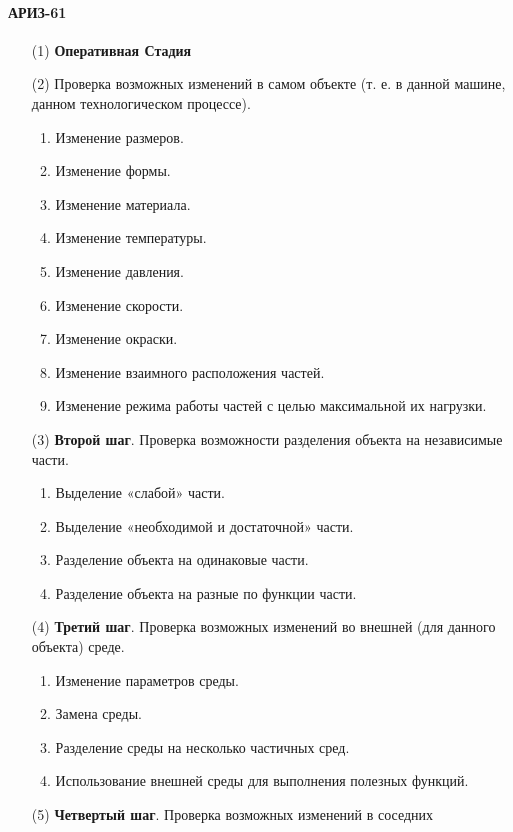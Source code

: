 \documentclass[11pt,a4paper]{article}
\begin{document}
\paragraph{АРИЗ-61 \cite{Altshuller1961}}
\begin{itemize}
\item[(1)] \textbf{Оперативная Стадия}
\item[(2)] Проверка возможных изменений в самом объекте (т. е. в данной
  машине, данном технологическом процессе).
  \begin{enumerate}
  \item Изменение размеров.
  \item Изменение формы.
  \item Изменение материала.
  \item Изменение температуры.
  \item Изменение давления.
  \item Изменение скорости.
  \item Изменение окраски.
  \item Изменение взаимного расположения частей.
  \item Изменение режима работы частей с целью максимальной их нагрузки.
\end{enumerate}
\item[(3)] \textbf{Второй шаг}. Проверка возможности разделения объекта на
  независимые части.
  \begin{enumerate}
  \item Выделение «слабой» части.
  \item Выделение «необходимой и достаточной» части.
  \item Разделение объекта на одинаковые части.
  \item Разделение объекта на разные по функции части.
  \end{enumerate}
\item[(4)] \textbf{Третий шаг}. Проверка возможных изменений во внешней (для
  данного объекта) среде.
  \begin{enumerate}
  \item Изменение параметров среды.
  \item Замена среды.
  \item Разделение среды на несколько частичных сред.
  \item Использование внешней среды для выполнения полезных функций.
\end{enumerate}
\item[(5)] \textbf{Четвертый шаг}. Проверка возможных изменений в соседних

\end{itemize}
\end{document}
